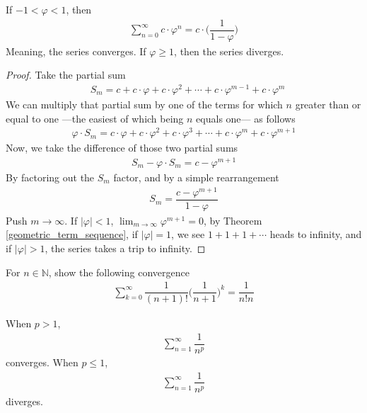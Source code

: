 \begin{theorem}
If $-1 < \varphi < 1$, then
\begin{align*}
    \sum_{n = 0}^{\infty} c \cdot \varphi^{n} = c \cdot \Big(\dfrac{1}{1 - \varphi}\Big)
\end{align*}
Meaning, the series converges. If $\varphi \geq 1$, then the series diverges.
\begin{proof}
Take the partial sum
\begin{align*}
    &S_{m} = c + c \cdot \varphi + c \cdot \varphi^{2} + \cdots + c \cdot \varphi^{m-1} + c \cdot \varphi^{m}
\end{align*}
We can multiply that partial sum by one of the terms for which $n$ greater than or equal to one ---the easiest of which being $n$ equals one--- as follows
\begin{align*}    
    \varphi \cdot S_{m} = c \cdot \varphi + c \cdot \varphi^{2} + c \cdot \varphi^{3} + \cdots + c \cdot \varphi^{m} + c \cdot \varphi^{m+1}
\end{align*}
Now, we take the difference of those two partial sums
\begin{align*}
    S_{m} - \varphi \cdot S_{m} = c - \varphi^{m+1}
\end{align*}
By factoring out the $S_{m}$ factor, and by a simple rearrangement
\begin{align*}
    S_{m} = \dfrac{c - \varphi^{m + 1}}{1 - \varphi}
\end{align*}
Push $m \longrightarrow \infty$. If $\lvert \varphi \rvert < 1$, $\lim_{m \longrightarrow \infty} \varphi^{m+1} = 0$, by Theorem \ref{geometric_term_sequence}, if $\lvert \varphi \rvert = 1$, we see $1 + 1 + 1 + \cdots$ heads to infinity, and if $\lvert \varphi \rvert > 1$, the series takes a trip to infinity. 
\end{proof}
\end{theorem}

\begin{exercise}
For $n \in \mathbb{N}$, show the following convergence
\begin{align*}
    \sum_{k=0}^{\infty} \dfrac{1}{(n+1)!} \Big(\dfrac{1}{n+1}\Big)^{k} = \dfrac{1}{n!n}
\end{align*}
\end{exercise}

\begin{theorem}
When $p > 1$, 
\begin{align*}
    \sum_{n = 1}^{\infty} \dfrac{1}{n^{p}}
\end{align*}
converges. When $p \leq 1$,
\begin{align*}
    \sum_{n = 1}^{\infty} \dfrac{1}{n^{p}}
\end{align*}
diverges.
\end{theorem}

